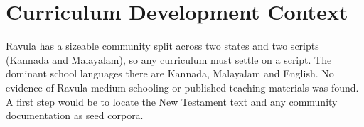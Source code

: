 \documentclass[12pt]{article}
\begin{document}
\section{Curriculum Development Context}
Ravula has a sizeable community split across two states and two scripts (Kannada and Malayalam), so any curriculum must settle on a script. The dominant school languages there are Kannada, Malayalam and English. No evidence of Ravula-medium schooling or published teaching materials was found. A first step would be to locate the New Testament text and any community documentation as seed corpora.
\end{document}
